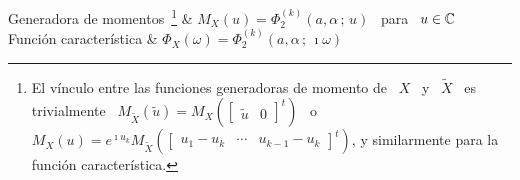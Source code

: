 \begin{center}
\begin{tabular}
%
Generadora de momentos~\footnote{El v\'inculo entre  las funciones  generadoras de
  momento  de \ $X$ \ y \ $\widetilde{X}$ \ es trivialmente  \ $M_{\widetilde{X}}\left(  \widetilde{u}  \right) =
  M_X\left(  \begin{bmatrix} \widetilde{u} &  0 \end{bmatrix}^t  \right)$ \  o \
  $M_X(u) =  e^{\imath u_k} M_{\widetilde{X}}\left( \begin{bmatrix} u_1  - u_k &
      \cdots &  u_{k-1} - u_k  \end{bmatrix}^t \right)$, y similarmente  para la
  funci\'on caracter\'istica.\label{Foot:MP:Dirichlet}} & $\displaystyle M_X(u) = \Phi_2^{(k)}( a , \alpha \, ;
\, u )$ \ para \ $u \in \mathbb{C}$\\[2mm]
\hline
Funci\'on caracter\'istica & $\displaystyle \Phi_X(\omega) = \Phi_2^{(k)}(
a , \alpha \, ; \, \imath \omega )$\\[2mm]
\hline
\end{tabular}
\end{center}
